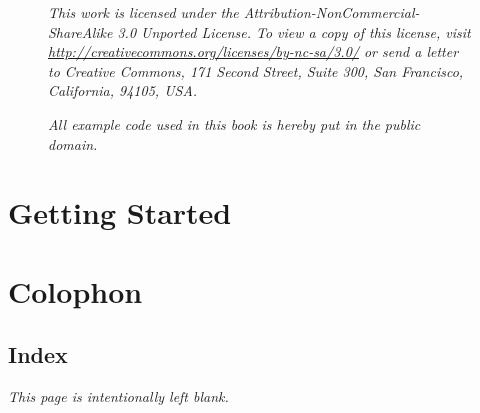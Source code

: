 \documentclass[letterpaper,twoside,openleft]{blocksbook}
\begin{document}
\newpage

\thispagestyle{empty}
\begin{figure}[H]
\begin{center}
\emph{
This work is licensed under the Attribution-NonCommercial-ShareAlike 3.0 Unported License. To
view a copy of this license, visit \url{http://creativecommons.org/licenses/by-nc-sa/3.0/} 
or send a letter
to Creative Commons, 171 Second Street, Suite 300, San Francisco, California, 94105, USA.}
\vspace{2em}

\emph{All example code used in this book is hereby put in the public domain.}
\end{center}

\end{figure}

\clearpage

\tableofcontents*
\listoffigures*
\listoftables*
\listofcode* 
\listofex* 

\clearpage


\chapter{Getting Started}
\label{chap:gettingstarted}



\appendix

\chapter{Colophon}



\begin{onecolumn}

\nocite{*} 


\begin{twocolumn}
\chapter{Index}
\printindex
\end{twocolumn}


\newpage
\thispagestyle{empty}
\begin{center}
\emph{This page is intentionally left blank.}
\end{center}
\end{onecolumn}
\end{document}
